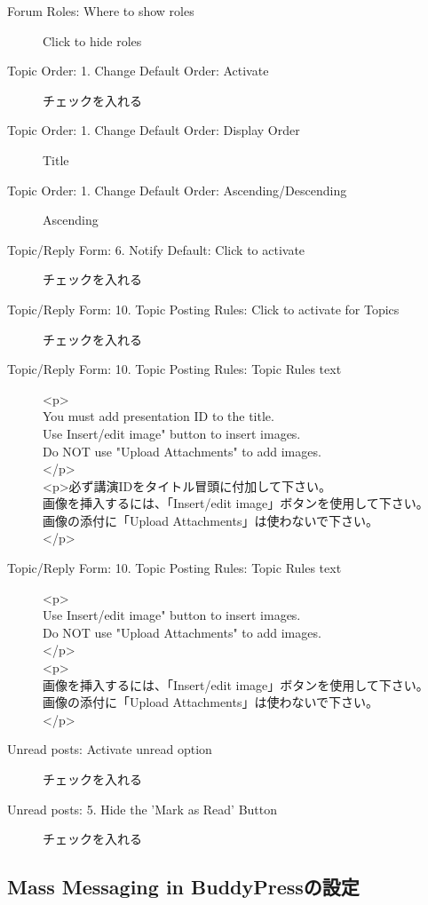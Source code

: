 \documentclass[titlepage,10pt,a4paper,uplatex]{jsbook}
\begin{document}
\begin{description}
\item[Forum Roles: Where to show roles] Click to hide roles
\item[Topic Order: 1. Change Default Order: Activate] チェックを入れる
\item[Topic Order: 1. Change Default Order: Display Order] Title
\item[Topic Order: 1. Change Default Order: Ascending/Descending] Ascending
\item[Topic/Reply Form: 6. Notify Default: Click to activate] チェックを入れる
\item[Topic/Reply Form: 10. Topic Posting Rules: Click to activate for Topics] チェックを入れる
\item[Topic/Reply Form: 10. Topic Posting Rules: Topic Rules text] <p>\\You must add presentation ID to the title.\\Use Insert/edit image" button to insert images.\\Do NOT use "Upload Attachments" to add images.\\</p>\\<p>必ず講演IDをタイトル冒頭に付加して下さい。\\画像を挿入するには、「Insert/edit image」ボタンを使用して下さい。\\画像の添付に「Upload Attachments」は使わないで下さい。\\</p>
\item[Topic/Reply Form: 10. Topic Posting Rules: Topic Rules text] <p>\\Use Insert/edit image" button to insert images.\\Do NOT use "Upload Attachments" to add images.\\</p>\\<p>\\画像を挿入するには、「Insert/edit image」ボタンを使用して下さい。\\画像の添付に「Upload Attachments」は使わないで下さい。\\</p>
\item[Unread posts: Activate unread option] チェックを入れる
\item[Unread posts: 5. Hide the 'Mark as Read' Button] チェックを入れる
\end{description}

\subsection{Mass Messaging in BuddyPressの設定}
\end{document}
